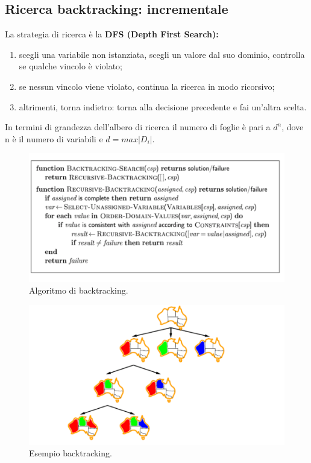 \subsection{Ricerca backtracking: incrementale}
La strategia di ricerca è la \textbf{DFS (Depth First Search):}
\begin{enumerate}
    \item scegli una variabile non istanziata, scegli un valore dal suo dominio, controlla se qualche vincolo è violato;
    \item se nessun vincolo viene violato, continua la ricerca in modo ricorsivo;
    \item altrimenti, torna indietro: torna alla decisione precedente e fai un’altra scelta.
\end{enumerate}
In termini di grandezza dell’albero di ricerca il numero di foglie è pari a $d^n$, dove n è il numero di variabili e $d = max|D_i|$.
\newpage
\begin{figure}[htp]
	\centering
    \includegraphics[width=12cm, keepaspectratio]{img/Cap2/dfs.png}
    \caption{Algoritmo di backtracking.}
\end{figure}
\begin{figure}[htp]
	\centering
    \includegraphics[width=12cm, keepaspectratio]{img/Cap2/dfs2.png}
    \caption{Esempio backtracking.}
\end{figure}
